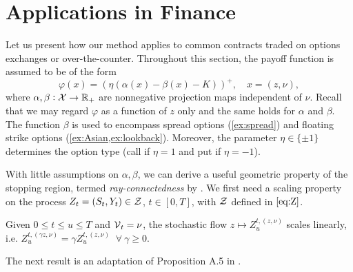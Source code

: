 \section{Applications in Finance}

Let us present how our method applies to common contracts traded on options exchanges or over-the-counter. 
Throughout this section,  the payoff function is assumed to be  of the form
\begin{equation}\label{eq:payoff}
    \varphi(x) = \left( \eta  (\alpha(x) - \beta(x)-K)\right)^+, \quad x = (z,\nu), 
\end{equation}
where $\alpha, \beta: \operatorname{\mathcal{X}} \to \operatorname{\mathbb{R}}_+$ 
are nonnegative projection maps independent of $\nu$. Recall that we may regard $\varphi$ as a function of $z$ only and the same holds for $\alpha$ and $\beta$.  
The function $\beta$ is used to encompass spread options (\cref{ex:spread}) and  floating strike options (\cref{ex:Asian,ex:lookback}). Moreover, the parameter  $\eta \in \{\pm 1\}$ determines the option type (call  if $\eta=1$ and  put  if $\eta=-1$).

  With little assumptions on $\alpha,\beta$, we can derive a useful geometric property of the stopping region, termed \textit{ray-connectedness} by  \citet{BroadieDetemple}. %
We first need a scaling property on the  process  $Z_t = (S_t,Y_t) \in \operatorname{\mathcal{Z}}$, $t\in[0,T]$,  with $\operatorname{\mathcal{Z}}$ defined in $\eqref{eq:Z}$. 

\begin{asm} \label{asm:scale}
    Given $0\le t \le u \le T$ and $\operatorname{\mathcal{V}}_t = \nu$, the stochastic flow $z \mapsto Z_u^{t,(z,\nu)}$  scales  linearly, i.e. 
    $Z_u^{t,(\gamma z,\nu)} = \gamma Z_u^{t,(z,\nu)}$ $\ \forall \ \gamma \ge 0$.
\end{asm}

The next result is an adaptation of  Proposition A.5 in  \cite{BroadieDetemple}. 


